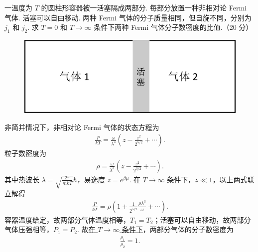 \documentclass{assignment}
\begin{document}
\begin{prob}
    一温度为 $T$ 的圆柱形容器被一活塞隔成两部分. 每部分放置一种非相对论 Fermi 气体. 活塞可以自由移动. 两种 Fermi 气体的分子质量相同，但自旋不同，分别为 $j_1$ 和 $j_2$. 求 $T=0$ 和 $T\rightarrow\infty$ 条件下两种 Fermi 气体分子数密度的比值.（20 分）
    \begin{figure}[h]
        \centering
        \includegraphics[width=.5\columnwidth]{P2.png}
    \end{figure}
\end{prob}
\begin{sol}
    非简并情况下，非相对论 Fermi 气体的状态方程为
    \begin{align}
        \frac{P}{kT}=\frac{\omega}{\lambda^3}\left(z-\frac{z^2}{2^{5/2}}+\cdots\right).
    \end{align}
    粒子数密度为
    \begin{align}
        \rho=\frac{\omega}{\lambda^3}\left(z-\frac{z^2}{2^{3/2}}+\cdots\right).
    \end{align}
    其中热波长 $\lambda=\sqrt{\frac{2\pi}{mkT}}\hbar$，易逸度 $z=e^{\beta\mu}$. 在 $T\rightarrow\infty$ 条件下，$z\ll 1$，以上两式联立解得
    \begin{align}
        \frac{P}{kT}=\rho\left(1+\frac{1}{2^{5/2}}\frac{\rho\lambda^3}{\omega}+\cdots\right).
    \end{align}
    容器温度给定，故两部分气体温度相等，$T_1=T_2$；活塞可以自由移动，故两部分气体压强相等，$P_1=P_2$. 故\uline{在 $T\rightarrow\infty$ 条件下}，两部分气体的分子数密度为
    \begin{align}
        \boxed{\frac{\rho_1}{\rho_2}=1.}
    \end{align}


\end{sol}
\end{document}
